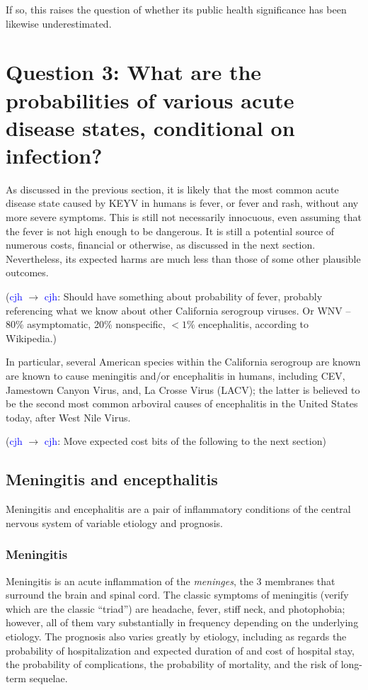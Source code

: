 \documentclass[12pt]{article}
\newcommand{\cjh}{\textcolor{blue}{cjh}}
\newcommand{\msg}[3]{(#1 $\rightarrow$ #2: #3)}
\newcommand{\mcc}[1]{\msg\cjh\cjh{#1}}
\begin{document}
            If so, this raises the question of whether its public health significance has been likewise underestimated.


    \section[Probabilities of disease, given infection]{Question 3: What are the probabilities of various acute disease states, conditional on infection?}
        As discussed in the previous section, it is likely that the most common acute disease state caused by KEYV in humans is fever, or fever and rash, without any more severe symptoms. This is still not necessarily innocuous, even assuming that the fever is not high enough to be dangerous. It is still a potential source of numerous costs, financial or otherwise, as discussed in the next section. Nevertheless, its expected harms are much less than those of some other plausible outcomes.

        \mcc{Should have something about probability of fever, probably referencing what we know about other California serogroup viruses. Or WNV -- 80\% asymptomatic, 20\% nonspecific, $<1\%$ encephalitis, according to Wikipedia.}

        In particular, several American species within the California serogroup are known are known to cause meningitis and/or encephalitis in humans, including CEV, Jamestown Canyon Virus, and, La Crosse Virus (LACV); the latter is believed to be the second most common arboviral causes of encephalitis in the United States today, after West Nile Virus.

        \mcc{Move expected cost bits of the following to the next section}
        \subsection{Meningitis and encepthalitis}
            Meningitis and encephalitis are a pair of inflammatory conditions of the central nervous system of variable etiology and prognosis.
            
            \subsubsection{Meningitis}
            Meningitis is an acute inflammation of the \textit{meninges}, the 3 membranes that surround the brain and spinal cord. The classic symptoms of meningitis (verify which are the classic ``triad'') are headache, fever, stiff neck, and photophobia; however, all of them vary substantially in frequency depending on the underlying etiology. The prognosis also varies greatly by etiology, including as regards the probability of hospitalization and expected duration of and cost of hospital stay, the probability of complications, the probability of mortality, and the risk of long-term sequelae.
\end{document}
